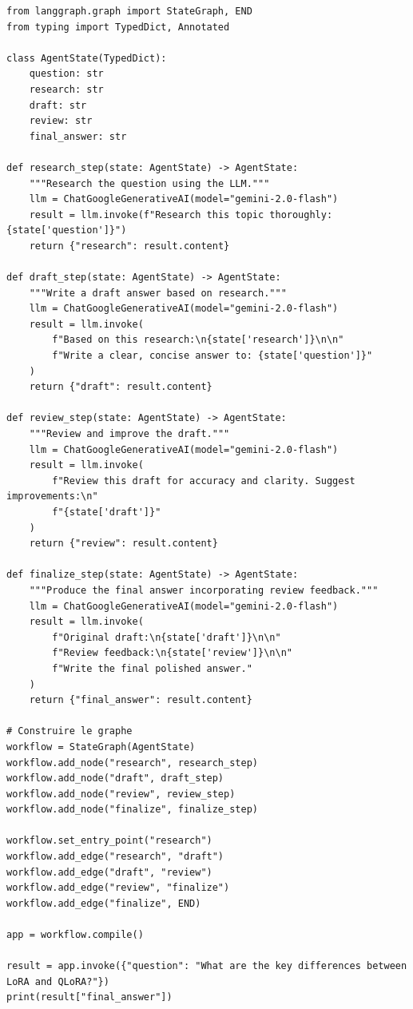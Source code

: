 \begin{verbatim}
from langgraph.graph import StateGraph, END
from typing import TypedDict, Annotated

class AgentState(TypedDict):
    question: str
    research: str
    draft: str
    review: str
    final_answer: str

def research_step(state: AgentState) -> AgentState:
    """Research the question using the LLM."""
    llm = ChatGoogleGenerativeAI(model="gemini-2.0-flash")
    result = llm.invoke(f"Research this topic thoroughly: {state['question']}")
    return {"research": result.content}

def draft_step(state: AgentState) -> AgentState:
    """Write a draft answer based on research."""
    llm = ChatGoogleGenerativeAI(model="gemini-2.0-flash")
    result = llm.invoke(
        f"Based on this research:\n{state['research']}\n\n"
        f"Write a clear, concise answer to: {state['question']}"
    )
    return {"draft": result.content}

def review_step(state: AgentState) -> AgentState:
    """Review and improve the draft."""
    llm = ChatGoogleGenerativeAI(model="gemini-2.0-flash")
    result = llm.invoke(
        f"Review this draft for accuracy and clarity. Suggest improvements:\n"
        f"{state['draft']}"
    )
    return {"review": result.content}

def finalize_step(state: AgentState) -> AgentState:
    """Produce the final answer incorporating review feedback."""
    llm = ChatGoogleGenerativeAI(model="gemini-2.0-flash")
    result = llm.invoke(
        f"Original draft:\n{state['draft']}\n\n"
        f"Review feedback:\n{state['review']}\n\n"
        f"Write the final polished answer."
    )
    return {"final_answer": result.content}

# Construire le graphe
workflow = StateGraph(AgentState)
workflow.add_node("research", research_step)
workflow.add_node("draft", draft_step)
workflow.add_node("review", review_step)
workflow.add_node("finalize", finalize_step)

workflow.set_entry_point("research")
workflow.add_edge("research", "draft")
workflow.add_edge("draft", "review")
workflow.add_edge("review", "finalize")
workflow.add_edge("finalize", END)

app = workflow.compile()

result = app.invoke({"question": "What are the key differences between LoRA and QLoRA?"})
print(result["final_answer"])
\end{verbatim}

